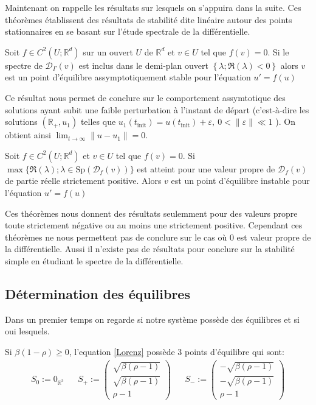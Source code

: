\documentclass{article}
\newcommand*\colv[1]{
\left(\begin{array}{c}
    #1
\end{array}\right)
}
\newcommand{\R}{\mathbb{R}}
\newcommand{\cad}{c'est-\`a-dire }
\newtheorem[M , nocut]{prop}{Proposition}[section]
\newtheorem[S , nocut]{definition}{Définition}
\newtheorem[S , nocut]{lemme}{Lemme}
\newtheorem[L , nocut]{thm}{Théoreme}
\newtheorem[L , nocut]{cor}{Corollaire}
\begin{document}
Maintenant on rappelle les résultats sur lesquels on s'appuira dans la suite. Ces théorèmes établissent des résultats de stabilité dite linéaire autour des points stationnaires en se basant sur l'étude spectrale de la différentielle.
\begin{thm}
    \label{thm:eq-ass-stable}
    Soit $f\in C^2(U;\R^d)$ sur un ouvert $U$ de $\R^d$ et $v\in U$ tel que $f(v)=0$. Si le spectre de $\mathcal{D}_\Gamma(v)$ est inclus dans le demi-plan ouvert $\left\{\lambda; \Re(\lambda)<0\right\}$ alors $v$ est un point d'équilibre assymptotiquement stable pour l'équation $u'=f(u)$
\end{thm}

Ce résultat nous permet de conclure sur le comportement assymtotique des solutions ayant subit une faible perturbation à l'instant de départ (\cad les solutions $(\R_+,u_1)$ telles que $u_1(t_{\text{init}})=u(t_{\text{init}})+\varepsilon,\ 0<\|\varepsilon\|\ll 1 $ ). On obtient ainsi $\lim_{t\to\infty}\|u-u_1\| = 0$.

\begin{thm}
    \label{thm:eq-instable}
    Soit $f\in C^2(U;\R^d)$ et $v\in U$ tel que $f(v)=0$. Si $\max\{\Re(\lambda); \lambda\in \mathrm{Sp}(\mathcal{D}_f(v))\}$ est atteint pour une valeur propre de $\mathcal{D}_f(v)$ de partie réelle strictement positive. Alors $v$ est un point d'équilibre instable pour l'équation $u'=f(u)$
\end{thm}


Ces théorèmes nous donnent des résultats seulemment pour des valeurs propre toute strictement négative ou au moins une strictement positive. Cependant ces théorèmes ne nous permettent pas de conclure sur le cas où $0$ est valeur propre de la différentielle. Aussi il n'existe pas de résultats pour conclure sur la stabilité simple en étudiant le spectre de la différentielle.

\subsection{Détermination des équilibres}
Dans un premier temps on regarde si notre système possède des équilibres et si oui lesquels.
\begin{prop}
    Si $\beta(1-\rho) \ge 0$, l'equation \eqref{Lorenz} possède 3 points d'équilibre qui sont:
    \begin{align*}
        S_0 := 0_{\R^3} &&   S_+ :=\colv{\sqrt{ \beta (\rho -1)} \\ \sqrt{\beta (\rho -1)}\\ \rho -1}  &&  S_- := \colv{-\sqrt{ \beta (\rho -1)} \\ - \sqrt{\beta (\rho -1)}\\ \rho -1}
    \end{align*}
\end{prop}
\end{document}
